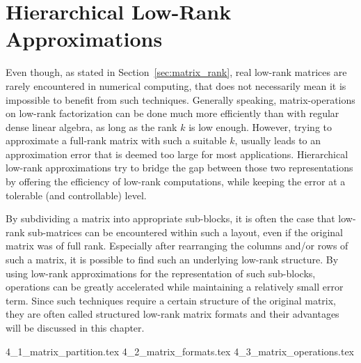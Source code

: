 \chapter{Hierarchical Low-Rank Approximations}
\label{chap:hierarchical_matrices}

Even though, as stated in Section~\hyperref[sec:matrix_rank]{\ref{sec:matrix_rank}}, real low-rank matrices are rarely encountered in numerical computing, that does not necessarily mean it is impossible to benefit from such techniques. Generally speaking, matrix-operations on low-rank factorization can be done much more efficiently than with regular dense linear algebra, as long as the rank $k$ is low enough. However, trying to approximate a full-rank matrix with such a suitable $k$, usually leads to an approximation error that is deemed too large for most applications. Hierarchical low-rank approximations try to bridge the gap between those two representations by offering the efficiency of low-rank computations, while keeping the error at a tolerable (and controllable) level.

By subdividing a matrix into appropriate sub-blocks, it is often the case that low-rank sub-matrices can be encountered within such a layout, even if the original matrix was of full rank. Especially after rearranging the columns and/or rows of such a matrix, it is possible to find such an underlying low-rank structure. By using low-rank approximations for the representation of such sub-blocks, operations can be greatly accelerated while maintaining a relatively small error term. Since such techniques require a certain structure of the original matrix, they are often called structured low-rank matrix formats and their advantages will be discussed in this chapter.


{4_1_matrix_partition.tex}
{4_2_matrix_formats.tex}
{4_3_matrix_operations.tex}